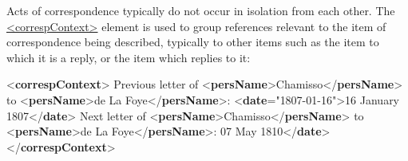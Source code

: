 Acts of correspondence typically do not occur in isolation from each other. The \hyperref[TEI.correspContext]{<correspContext>} element is used to group references relevant to the item of correspondence being described, typically to other items such as the item to which it is a reply, or the item which replies to it: \par\bgroup{}\exampleFont \begin{shaded}\noindent\mbox{}{<\textbf{correspContext}>}\mbox{}\newline 
{}Previous letter of {<\textbf{persName}>}Chamisso{</\textbf{persName}>} to {<\textbf{persName}>}de La\mbox{}\newline 
\hspace*{1em}\hspace*{1em}\hspace*{1em}\hspace*{1em} Foye{</\textbf{persName}>}: {<\textbf{date}\hspace*{1em}{when}="{1807-01-16}">}16 January 1807{</\textbf{date}>}\mbox{}\newline 
{}\mbox{}\newline 
{}Next letter of {<\textbf{persName}>}Chamisso{</\textbf{persName}>} to {<\textbf{persName}>}de La Foye{</\textbf{persName}>}:\mbox{}\newline 
{}07 May 1810{</\textbf{date}>}\mbox{}\newline 
{}\mbox{}\newline 
{</\textbf{correspContext}>}\end{shaded}\egroup\par \par
